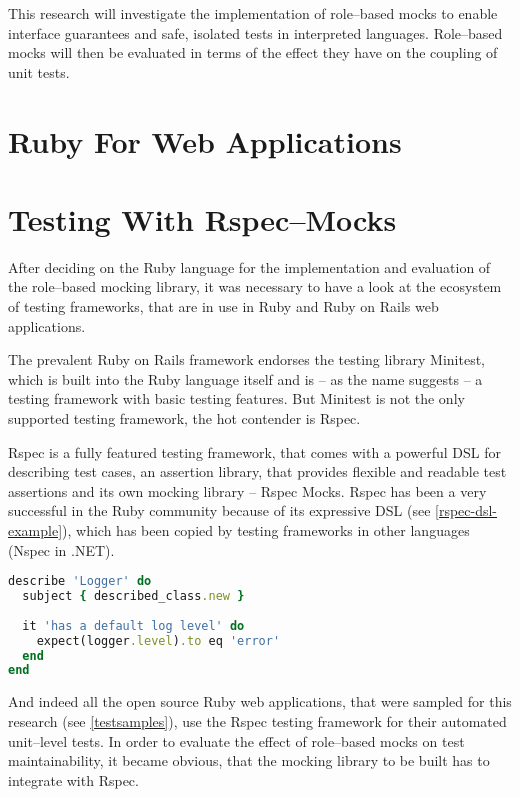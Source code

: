 This research will investigate the implementation of role–based mocks to enable interface guarantees and safe, isolated tests in interpreted languages. Role–based mocks will then be evaluated in terms of the effect they have on the coupling of unit tests.

\section{Ruby For Web Applications}

\section{Testing With Rspec--Mocks}
After deciding on the Ruby language for the implementation and evaluation of the role–based mocking library, it was necessary to have a look at the ecosystem of testing frameworks, that are in use in Ruby and Ruby on Rails web applications.

The prevalent Ruby on Rails framework endorses the testing library Minitest, which is built into the Ruby language itself and is – as the name suggests – a testing framework with basic testing features. But Minitest is not the only supported testing framework, the hot contender is Rspec.

Rspec is a fully featured testing framework, that comes with a powerful \ac{DSL} for describing test cases, an assertion library, that provides flexible and readable test assertions and its own mocking library – Rspec Mocks. Rspec has been a very successful in the Ruby community because of its expressive \ac{DSL} (see \autoref{rspec-dsl-example}), which has been copied by testing frameworks in other languages (\eg Nspec in .NET).

\begin{lstlisting}[float,caption=An example Rspec test,label=rspec-dsl-example,language=ruby]
describe 'Logger' do
  subject { described_class.new }
  
  it 'has a default log level' do
    expect(logger.level).to eq 'error'
  end
end
\end{lstlisting}

And indeed all the open source Ruby web applications, that were sampled for this research (see \autoref{testsamples}), use the Rspec testing framework for their automated unit–level tests. In order to evaluate the effect of role–based mocks on test maintainability, it became obvious, that the mocking library to be built has to integrate with Rspec.

